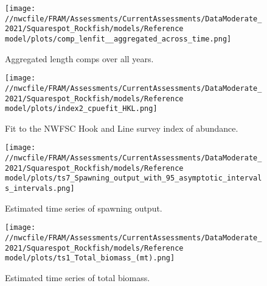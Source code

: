 \documentclass[11pt,
  english,
  a4paper,
]{article}
\begin{document}

\begin{figure}
\centering
\texttt{[image: //nwcfile/FRAM/Assessments/CurrentAssessments/DataModerate\_2021/Squarespot\_Rockfish/models/Reference model/plots/comp\_lenfit\_\_aggregated\_across\_time.png]}
\caption{Aggregated length comps over all years.\label{fig:agg-len-fit}}
\end{figure}

\tagmcend\tagstructend


\begin{figure}
\centering
\texttt{[image: //nwcfile/FRAM/Assessments/CurrentAssessments/DataModerate\_2021/Squarespot\_Rockfish/models/Reference model/plots/index2\_cpuefit\_HKL.png]}
\caption{Fit to the NWFSC Hook and Line survey index of abundance.\label{fig:hkl-index-fit}}
\end{figure}

\tagmcend\tagstructend


\begin{figure}
\centering
\texttt{[image: //nwcfile/FRAM/Assessments/CurrentAssessments/DataModerate\_2021/Squarespot\_Rockfish/models/Reference model/plots/ts7\_Spawning\_output\_with\_95\_asymptotic\_intervals\_intervals.png]}
\caption{Estimated time series of spawning output.\label{fig:ssb}}
\end{figure}

\tagmcend\tagstructend


\begin{figure}
\centering
\texttt{[image: //nwcfile/FRAM/Assessments/CurrentAssessments/DataModerate\_2021/Squarespot\_Rockfish/models/Reference model/plots/ts1\_Total\_biomass\_(mt).png]}
\caption{Estimated time series of total biomass.\label{fig:tot-bio}}
\end{figure}

\tagmcend\tagstructend
\end{document}
